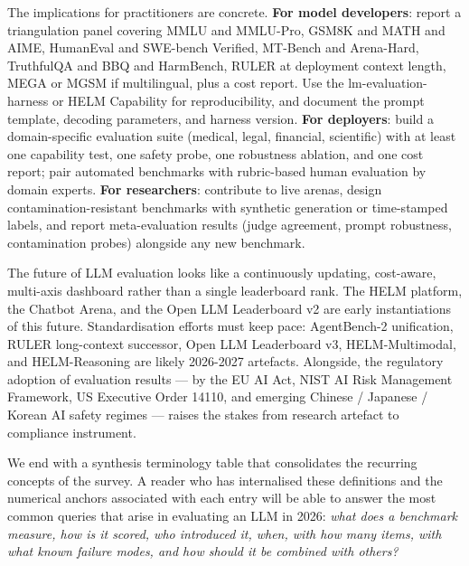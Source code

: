 The implications for practitioners are concrete. \textbf{For model developers}: report a triangulation panel covering MMLU and MMLU-Pro, GSM8K and MATH and AIME, HumanEval and SWE-bench Verified, MT-Bench and Arena-Hard, TruthfulQA and BBQ and HarmBench, RULER at deployment context length, MEGA or MGSM if multilingual, plus a cost report. Use the lm-evaluation-harness or HELM Capability for reproducibility, and document the prompt template, decoding parameters, and harness version. \textbf{For deployers}: build a domain-specific evaluation suite (medical, legal, financial, scientific) with at least one capability test, one safety probe, one robustness ablation, and one cost report; pair automated benchmarks with rubric-based human evaluation by domain experts. \textbf{For researchers}: contribute to live arenas, design contamination-resistant benchmarks with synthetic generation or time-stamped labels, and report meta-evaluation results (judge agreement, prompt robustness, contamination probes) alongside any new benchmark.

The future of LLM evaluation looks like a continuously updating, cost-aware, multi-axis dashboard rather than a single leaderboard rank. The HELM platform, the Chatbot Arena, and the Open LLM Leaderboard v2 are early instantiations of this future. Standardisation efforts must keep pace: AgentBench-2 unification, RULER long-context successor, Open LLM Leaderboard v3, HELM-Multimodal, and HELM-Reasoning are likely 2026-2027 artefacts. Alongside, the regulatory adoption of evaluation results --- by the EU AI Act, NIST AI Risk Management Framework, US Executive Order 14110, and emerging Chinese / Japanese / Korean AI safety regimes --- raises the stakes from research artefact to compliance instrument.

We end with a synthesis terminology table that consolidates the recurring concepts of the survey. A reader who has internalised these definitions and the numerical anchors associated with each entry will be able to answer the most common queries that arise in evaluating an LLM in 2026: \emph{what does a benchmark measure, how is it scored, who introduced it, when, with how many items, with what known failure modes, and how should it be combined with others?}

